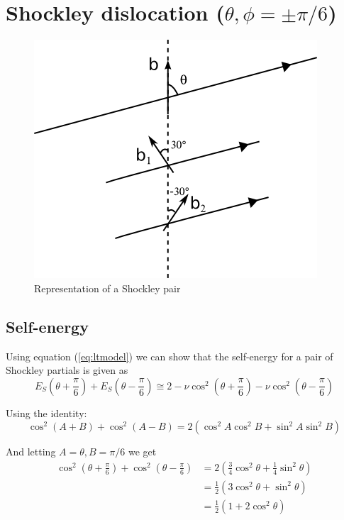 \documentclass[10pt,a4paper,final]{article}
\begin{document}
\section{Shockley dislocation ($\theta, \phi=\pm\pi/6$)}
\begin{figure}[hbtp]
\centering
\includegraphics[scale=1]{png/shockley_schema.png}
\caption{Representation of a Shockley pair}
\end{figure}

\subsection{Self-energy}
Using equation (\ref{eq:ltmodel}) we can show that the self-energy for a pair of Shockley partials is given as
\begin{equation}
E_S\left(\theta+\frac{\pi}{6}\right) + E_S\left(\theta-\frac{\pi}{6}\right) \cong 2 - \nu\cos^2\left(\theta+\frac{\pi}{6}\right) - \nu\cos^2\left(\theta-\frac{\pi}{6}\right) \label{eq:self1shoc}
\end{equation}

Using the identity: 
\begin{equation}
\cos^2(A+B) + \cos^2(A-B) = 2(\cos^2A\cos^2B + \sin^2A\sin^2B) \label{eqcosplus}
\end{equation}

And letting $A = \theta, B = \pi/6$ we get
\begin{subequations}
\begin{align*}
\cos^2\left(\theta+\frac{\pi}{6}\right) + \cos^2\left(\theta-\frac{\pi}{6}\right) &= 
2\left(\frac{3}{4}\cos^2\theta + \frac{1}{4}\sin^2\theta \right) \\
&= \frac{1}{2}(3\cos^2\theta + \sin^2\theta) \\
&= \frac{1}{2}(1+2\cos^2\theta)
\end{align*}
\end{subequations}
\end{document}
